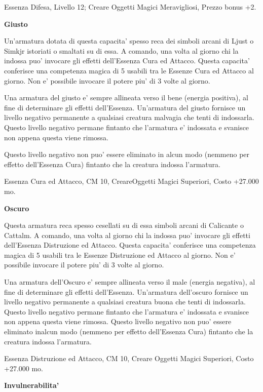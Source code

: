\documentclass[a4paper,11pt,twoside,openany]{book}
\begin{document}
{		Essenza Difesa, Livello 12; Creare Oggetti Magici Meravigliosi, Prezzo bonus +2.
		
		\textbf{Giusto}
		
		Un'armatura dotata di questa capacita' spesso reca dei simboli arcani di Ljust o Simkjr istoriati o smaltati su di essa. A comando, una volta al giorno chi la indossa puo' invocare gli effetti dell'Essenza Cura ed Attacco. Questa capacita' conferisce una competenza magica di 5 usabili tra le Essenze Cura ed Attacco al giorno. Non e' possibile invocare il potere piu' di 3 volte al giorno.
		
		Una armatura del giusto e' sempre allineata verso il bene (energia positiva), al fine di determinare gli effetti dell'Essenza. Un'armatura del giusto fornisce un livello negativo permanente a qualsiasi creatura malvagia che tenti di indossarla. Questo livello negativo permane fintanto che l'armatura e' indossata e svanisce non appena questa viene rimossa.
		
		Questo livello negativo non puo' essere eliminato in alcun modo (nemmeno per effetto dell'Essenza Cura) fintanto che la creatura indossa l'armatura.
		
		Essenza Cura ed Attacco, CM 10, CreareOggetti Magici Superiori, Costo +27.000 mo.
		
		\textbf{Oscuro}
		
		Questa armatura reca spesso cesellati su di essa simboli arcani di Calicante o Cattalm. A comando, una volta al giorno chi la indossa puo' invocare gli effetti dell'Essenza Distruzione ed Attacco. Questa capacita' conferisce una competenza magica di 5 usabili tra le Essenze Distruzione ed Attacco al giorno. Non e' possibile invocare il potere piu' di 3 volte al giorno.
		
		Una armatura dell'Oscuro e' sempre allineata verso il male (energia negativa), al fine di determinare gli effetti dell'Essenza. Un'armatura dell'oscuro fornisce un livello negativo permanente a qualsiasi creatura buona che tenti di indossarla. Questo livello negativo permane fintanto che l'armatura e' indossata e svanisce non appena questa viene rimossa. Questo livello negativo non puo' essere eliminato inalcun modo (nemmeno per effetto dell'Essenza Cura) fintanto che la creatura indossa l'armatura. 
		
		Essenza Distruzione ed Attacco, CM 10, Creare Oggetti Magici Superiori,
		Costo +27.000 mo.
		
		\textbf{Invulnerabilita'}
		
}
\end{document}
